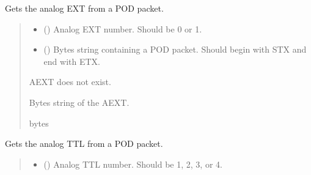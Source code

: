 \documentclass[letterpaper,10pt,english]{sphinxmanual}
\begin{document}
\begin{fulllineitems}
\begin{fulllineitems}
\label{\detokenize{PodApi.Packets:PodApi.Packets.Binary5.PacketBinary5.GetAnalogEXT}}
\pysigstartsignatures
{}
\pysigstopsignatures
\sphinxAtStartPar
Gets the analog EXT from a POD packet.
\begin{quote}\begin{description}
\begin{itemize}
\item {} 
\sphinxAtStartPar
{} () \textendash{} Analog EXT number. Should be 0 or 1.

\item {} 
\sphinxAtStartPar
{} () \textendash{} Bytes string containing a POD packet. Should begin with STX and                 end with ETX.

\end{itemize}

\sphinxAtStartPar
{} \textendash{} AEXT does not exist.

\sphinxAtStartPar
Bytes string of the AEXT.

\sphinxAtStartPar
bytes

\end{description}\end{quote}

\end{fulllineitems}


\begin{fulllineitems}
\label{\detokenize{PodApi.Packets:PodApi.Packets.Binary5.PacketBinary5.GetAnalogTTL}}
\pysigstartsignatures
{}
\pysigstopsignatures
\sphinxAtStartPar
Gets the analog TTL from a POD packet.
\begin{quote}\begin{description}
\begin{itemize}
\item {} 
\sphinxAtStartPar
{} () \textendash{} Analog TTL number. Should be 1, 2, 3, or 4.


\end{itemize}
\end{description}
\end{quote}
\end{fulllineitems}
\end{fulllineitems}
\end{document}
